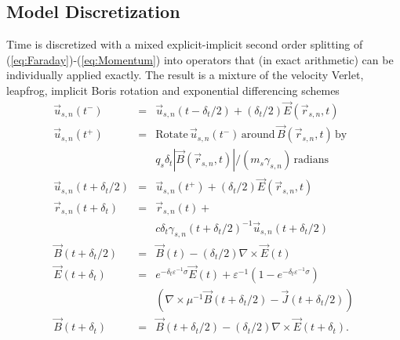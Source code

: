 \documentclass[journal,twoside]{IEEEtran}
\newcommand{\eps}{\varepsilon}
\newcommand{\vecr}{\vec{r}}
\newcommand{\vecu}{\vec{u}}
\newcommand{\vecJ}{\vec{J}}
\newcommand{\vecE}{\vec{E}}
\newcommand{\vecB}{\vec{B}}
\newcommand{\Curl}[1]{\nabla \times #1}
\newcommand{\eq}[1]{(\ref{eq:#1})}
\begin{document}
\subsection{Model Discretization}

Time is discretized with a mixed explicit-implicit second order
splitting of \eq{Faraday}-\eq{Momentum} into operators that (in exact
arithmetic) can be individually applied exactly.  The result is a
mixture of the velocity Verlet, leapfrog, implicit Boris rotation and
exponential differencing schemes
\begin{eqnarray*}
\vecu_{s,n}\left(t^-\right) &=&\vecu_{s,n}\left(t-\delta_t/2\right) +
  \left(\delta_t/2\right)\vecE\left(\vecr_{s,n},t\right) \\
\vecu_{s,n}\left(t^+\right) &=&
  \textrm{Rotate}\,\vecu_{s,n}\left(t^-\right)\,\textrm{around}\,
  \vecB\left(\vecr_{s,n},t\right)\,\textrm{by}\\&&
  q_s\delta_t\left|\vecB\left(\vecr_{s,n},t\right)\right| /
  \left(m_s\gamma_{s,n}\right)\,\textrm{radians} \\
\vecu_{s,n}\left(t+\delta_t/2\right) &=&\vecu_{s,n}\left(t^+\right) +
  \left(\delta_t/2\right)\vecE\left(\vecr_{s,n},t\right) \\
\vecr_{s,n}\left(t+\delta_t\right) &=& \vecr_{s,n}\left(t\right) +\\&&
  c\delta_t\gamma_{s,n}\left(t+\delta_t/2\right)^{-1}
           \vecu_{s,n}\left(t+\delta_t/2\right) \\
\vecB\left(t+\delta_t/2\right) &=&
  \vecB\left(t\right) -
  \left(\delta_t/2\right)\Curl{\vecE\left(t\right)} \\
\vecE\left(t+\delta_t\right) &=&
  e^{-\delta_t\eps^{-1}\sigma}\vecE\left(t\right) + 
  \eps^{-1}\left(1-e^{-\delta_t\eps^{-1}\sigma}\right) \\
&&\left( \Curl{\mu^{-1}\vecB\left(t+\delta_t/2\right)} -
         \vecJ\left(t+\delta_t/2\right) \right) \\
\vecB\left(t+\delta_t\right) &=& \vecB\left(t+\delta_t/2\right) -
  \left(\delta_t/2\right)\Curl{\vecE\left(t+\delta_t\right)}
.
\end{eqnarray*}
\end{document}
